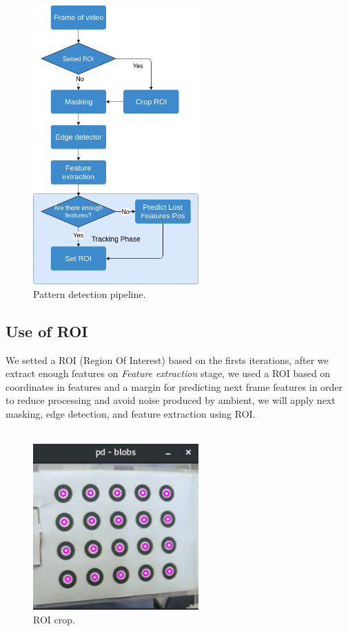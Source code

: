 \documentclass[journal]{IEEEtran}
\begin{document}
\begin{figure}[H]
\centering
\includegraphics[width=2.5in]{_img/algorithm_overview.png}
\caption{Pattern detection pipeline.}
\end{figure}

\subsection{ Use of ROI }
We setted a ROI (Region Of Interest) based on the firsts iterations, after we extract enough features on \textit{Feature extraction} stage, we used a ROI based on coordinates in features and a margin for predicting next frame features in order to reduce processing and avoid noise produced by ambient, we will apply next masking, edge detection, and feature extraction using ROI.
\\
\\
\begin{figure}[H]
\centering
\includegraphics[width=2.5in]{_img/img_report2_processing_window.png}
\caption{ROI crop.}
\end{figure}
\end{document}
